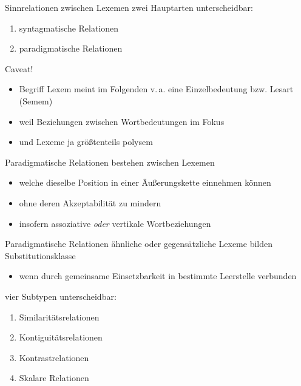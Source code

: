 \begin{frame}{Sinnrelationen zwischen Lexemen}
\onslide<+->
zwei Hauptarten unterscheidbar:
\begin{enumerate}[<+->]
	\item		syntagmatische Relationen
	\item		paradigmatische Relationen
\end{enumerate}
\onslide<+->
\Zeile
\begin{block}{Caveat!}
\begin{itemize}[<+->]
	\item		Begriff Lexem meint im Folgenden v.\,a. eine Einzelbedeutung bzw. Lesart (Semem)
	\item		weil Beziehungen zwischen Wortbedeutungen im Fokus
	\item		und Lexeme ja größtenteils polysem
\end{itemize}
\end{block}
\end{frame}

\begin{frame}{Paradigmatische Relationen}
\onslide<+->
bestehen zwischen Lexemen
\begin{itemize}[<+->]
	\item		welche dieselbe Position in einer Äußerungskette einnehmen können
	\item		ohne deren Akzeptabilität zu mindern
	\item		insofern assoziative \textit{oder} vertikale Wortbeziehungen
\end{itemize}
\onslide<+->
\Zeile
\begin{exe}
	 \onslide<+->
\end{exe}
\end{frame}
			
\begin{frame}{Paradigmatische Relationen}
\onslide<+->
ähnliche oder gegensätzliche Lexeme bilden Substitutionsklasse
\begin{itemize}[<+->]
	\item		wenn durch gemeinsame Einsetzbarkeit in bestimmte Leerstelle verbunden
\end{itemize}
\onslide<+->
\Zeile
vier Subtypen unterscheidbar:
\begin{enumerate}[<+->]
	\item		Similaritätsrelationen
	\item		Kontiguitätsrelationen
	\item		Kontrastrelationen
	\item		Skalare Relationen
\end{enumerate}
\end{frame}


